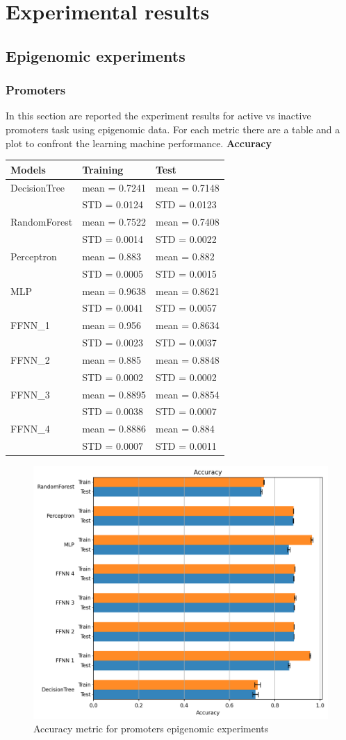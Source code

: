 \section{Experimental results}

\subsection{Epigenomic experiments}

\subsubsection{Promoters}

In this section are reported the experiment results for active vs
inactive promoters task using epigenomic data. For each metric there are
a table and a plot to confront the learning machine performance.
\newpage
\textbf{Accuracy}

\begin{longtable}[]{@{}lll@{}}
\toprule
\textbf{Models} & \textbf{Training} & \textbf{Test}\tabularnewline
\midrule
\endhead
DecisionTree & mean = 0.7241 & mean = 0.7148\tabularnewline
& STD = 0.0124 & STD = 0.0123\tabularnewline
RandomForest & mean = 0.7522 & mean = 0.7408\tabularnewline
& STD = 0.0014 & STD = 0.0022\tabularnewline
Perceptron & mean = 0.883 & mean = 0.882\tabularnewline
& STD = 0.0005 & STD = 0.0015\tabularnewline
MLP & mean = 0.9638 & mean = 0.8621\tabularnewline
& STD = 0.0041 & STD = 0.0057\tabularnewline
FFNN\_1 & mean = 0.956 & mean = 0.8634\tabularnewline
& STD = 0.0023 & STD = 0.0037\tabularnewline
FFNN\_2 & mean = 0.885 & mean = 0.8848\tabularnewline
& STD = 0.0002 & STD = 0.0002\tabularnewline
FFNN\_3 & mean = 0.8895 & mean = 0.8854\tabularnewline
& STD = 0.0038 & STD = 0.0007\tabularnewline
FFNN\_4 & mean = 0.8886 & mean = 0.884\tabularnewline
& STD = 0.0007 & STD = 0.0011\tabularnewline
\bottomrule
\end{longtable}

\begin{figure}[h!]
\centering
\includegraphics[width=0.77\linewidth]{../images/epigemomic_results/promoters/accuracy.png}
\caption{Accuracy metric for promoters epigenomic experiments}
\end{figure}

